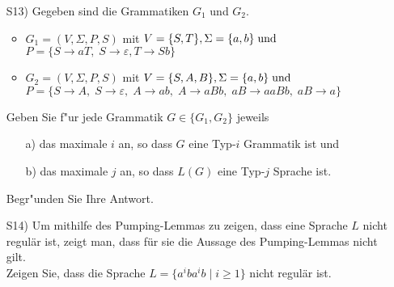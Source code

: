 \begin{exercise}
\begin{enumerate}
\item[S13)] Gegeben sind die Grammatiken $G_1$ und $G_2$.
\begin{itemize}
\item $G_1=(V,\Sigma, P, S)$ mit
$V=\{S,T\},\Sigma=\{a,b\} \;{\rm{und}}$\\
$P=\{S\rightarrow aT,\;S\rightarrow \varepsilon, T\rightarrow Sb\}$
\item $G_2=(V,\Sigma, P, S)$ mit
$V=\{S,A,B\},\Sigma=\{a,b\} \;{\rm{und}}$\\
$P=\{S\rightarrow A,\;S\rightarrow \varepsilon,\;A\rightarrow
      ab,\;A\rightarrow aBb,\;aB\rightarrow
      aaBb,\; aB\rightarrow a\}$
\end{itemize}
Geben Sie f"ur jede Grammatik $G\in\{G_1,G_2\}$ jeweils 
\begin{enumerate}
\item [a)] das maximale $i$ an, so dass $G$ eine Typ-$i$ Grammatik ist und
\item [b)] das maximale $j$ an, so dass $L(G)$ eine Typ-$j$ Sprache ist. 
\end{enumerate}
Begr"unden Sie Ihre Antwort. 
\item[S14)] Um mithilfe des Pumping-Lemmas zu zeigen, dass eine Sprache $L$ nicht regul\"ar ist, zeigt man, dass für sie die Aussage des Pumping-Lemmas
nicht gilt.\\
Zeigen Sie, dass die Sprache $L=\{a^iba^ib\mid i\ge 1\}$ nicht regul\"ar ist.   
\end{enumerate} 

\end{exercise}
